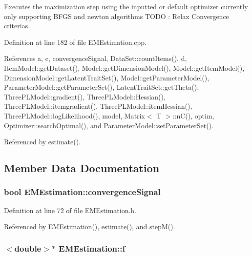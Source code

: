 Executes the maximization step using the inputted or default optimizer currently only supporting B\+F\+G\+S and newton algorithms T\+O\+D\+O \+: Relax Convergence criterias. 



Definition at line 182 of file E\+M\+Estimation.\+cpp.



References a, c, convergence\+Signal, Data\+Set\+::count\+Items(), d, Item\+Model\+::get\+Dataset(), Model\+::get\+Dimension\+Model(), Model\+::get\+Item\+Model(), Dimension\+Model\+::get\+Latent\+Trait\+Set(), Model\+::get\+Parameter\+Model(), Parameter\+Model\+::get\+Parameter\+Set(), Latent\+Trait\+Set\+::get\+Theta(), Three\+P\+L\+Model\+::gradient(), Three\+P\+L\+Model\+::\+Hessian(), Three\+P\+L\+Model\+::itemgradient(), Three\+P\+L\+Model\+::item\+Hessian(), Three\+P\+L\+Model\+::log\+Likelihood(), model, Matrix$<$ T $>$\+::n\+C(), optim, Optimizer\+::search\+Optimal(), and Parameter\+Model\+::set\+Parameter\+Set().



Referenced by estimate().



\subsection{Member Data Documentation}
\hypertarget{classEMEstimation_aaa1a979767c171c5d33ee1ac77838ac2}{}
\subsubsection[{convergence\+Signal}]{\setlength{\rightskip}{0pt plus 5cm}bool E\+M\+Estimation\+::convergence\+Signal\hspace{0.3cm}{\ttfamily [private]}}\label{classEMEstimation_aaa1a979767c171c5d33ee1ac77838ac2}


Definition at line 72 of file E\+M\+Estimation.\+h.



Referenced by E\+M\+Estimation(), estimate(), and step\+M().

\hypertarget{classEMEstimation_a4ad566123ad607b791d56990f9dd096d}{}
\subsubsection[{f}]{$<$double$>$$\ast$ E\+M\+Estimation\+::f\hspace{0.3cm}{\ttfamily [private]}}\label{classEMEstimation_a4ad566123ad607b791d56990f9dd096d}


